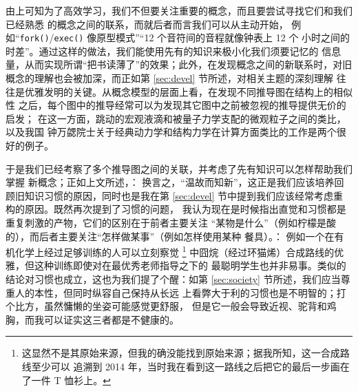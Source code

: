 由上可知为了高效学习，我们不但要关注重要的概念，而且要尝试寻找它们和我们已经熟悉
的概念之间的联系，而就后者而言我们可以从主动开始，
例如“\verb|fork()|/\verb|exec()| 像原型模式”“12 个音符间的音程就像钟表上 12 个
小时之间的时差”。通过这样的做法，我们能使用先有的知识来极小化我们须要记忆的
信息量，从而实现所谓“把书读薄了”的效果；此外，在发现概念之间的新联系时，对旧
概念的理解也会被加深，而正如第 \ref{sec:devel} 节所述，对相关主题的深刻理解
往往是优雅发明的关键。从概念模型的层面上看，在发现不同推导图在结构上的相似性
之后，每个图中的推导经常可以为发现其它图中之前被忽视的推导提供无价的启发；
在这一方面，跳动的宏观液滴和被量子力学支配的微观粒子之间的类比，以及我国
钟万勰院士关于经典动力学和结构力学在计算方面类比的工作是两个很好的例子。

于是我们已经考察了多个推导图之间的关联，并考虑了先有知识可以怎样帮助我们掌握
新概念；正如上文所述，：
换言之，“温故而知新”，这正是我们应该培养回顾旧知识习惯的原因，同时也是我在第
\ref{sec:devel} 节中提到我们应该经常考虑重构的原因。既然再次提到了习惯的问题，
我认为现在是时候指出直觉和习惯都是重复刺激的产物，它们的区别在于前者主要关注
“某物是什么”（例如柠檬是酸的），而后者主要关注“怎样做某事”（例如怎样使用某种
餐具）。：
例如一个在有机化学上经过足够训练的人可以立刻察觉 \parencite{zxhxy2018}\footnote%
{这显然不是其原始来源，但我的确没能找到原始来源；据我所知，这一合成路线至少可以
追溯到 2014 年，当时我在看到这一路线之后把它的最后一步画在了一件 T 恤衫上。}%
中囧烷（经过环猫烯）合成路线的优雅，但这种训练即使对在最优秀老师指导之下的
最聪明学生也并非易事。类似的结论对习惯也成立，这也为我们提了个醒：如第
\ref{sec:society} 节所述，我们应当尊重人的本性，但同时纵容自己保持从长远
上看弊大于利的习惯也是不明智的；打个比方，虽然慵懒的坐姿可能感觉更舒服，
但是它一般会导致近视、驼背和鸡胸，而我可以证实这三者都是不健康的。

